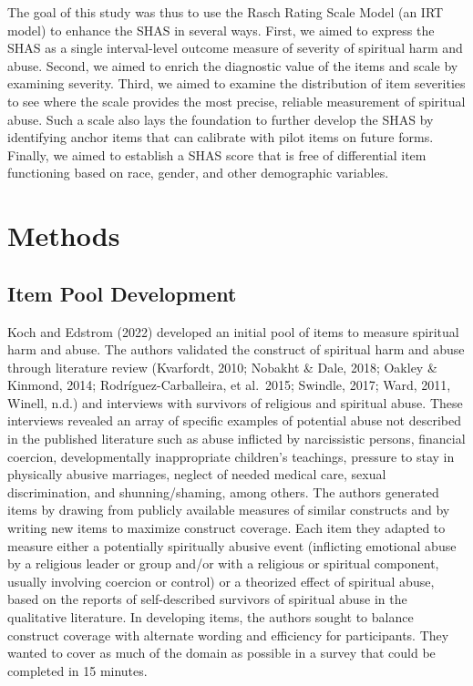 \documentclass[
  letterpaper,
]{article}
\begin{document}
The goal of this study was thus to use the Rasch Rating Scale Model (an
IRT model) to enhance the SHAS in several ways. First, we aimed to
express the SHAS as a single interval-level outcome measure of severity
of spiritual harm and abuse. Second, we aimed to enrich the diagnostic
value of the items and scale by examining severity. Third, we aimed to
examine the distribution of item severities to see where the scale
provides the most precise, reliable measurement of spiritual abuse. Such
a scale also lays the foundation to further develop the SHAS by
identifying anchor items that can calibrate with pilot items on future
forms. Finally, we aimed to establish a SHAS score that is free of
differential item functioning based on race, gender, and other
demographic variables.


\hypertarget{methods}{%
\chapter*{Methods}\label{methods}}

\hypertarget{item-pool-development}{%
\section*{Item Pool Development}\label{item-pool-development}}

Koch and Edstrom (2022) developed an initial pool of items to measure
spiritual harm and abuse. The authors validated the construct of
spiritual harm and abuse through literature review (Kvarfordt, 2010;
Nobakht \& Dale, 2018; Oakley \& Kinmond, 2014; Rodríguez-Carballeira,
et al.~2015; Swindle, 2017; Ward, 2011, Winell, n.d.) and interviews
with survivors of religious and spiritual abuse. These interviews
revealed an array of specific examples of potential abuse not described
in the published literature such as abuse inflicted by narcissistic
persons, financial coercion, developmentally inappropriate children's
teachings, pressure to stay in physically abusive marriages, neglect of
needed medical care, sexual discrimination, and shunning/shaming, among
others. The authors generated items by drawing from publicly available
measures of similar constructs and by writing new items to maximize
construct coverage. Each item they adapted to measure either a
potentially spiritually abusive event (inflicting emotional abuse by a
religious leader or group and/or with a religious or spiritual
component, usually involving coercion or control) or a theorized effect
of spiritual abuse, based on the reports of self-described survivors of
spiritual abuse in the qualitative literature. In developing items, the
authors sought to balance construct coverage with alternate wording and
efficiency for participants. They wanted to cover as much of the domain
as possible in a survey that could be completed in 15 minutes.
\end{document}
